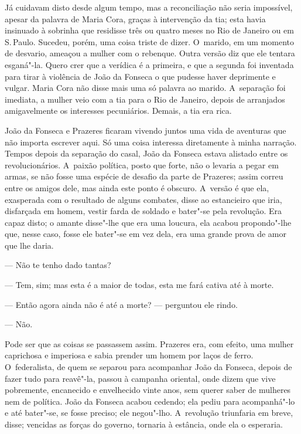 \begin{linenumbers}
Já cuidavam disto desde algum tempo, mas a reconciliação não seria
impossível, apesar da palavra de Maria Cora, graças à intervenção da
tia; esta havia insinuado à sobrinha que residisse três ou quatro meses
no Rio de Janeiro ou em S.\,Paulo. Sucedeu, porém, uma coisa triste de
dizer. O~marido, em um momento de desvario, ameaçou a mulher com o
rebenque. Outra versão diz que ele tentara esganá"-la. Quero crer que a
verídica é a primeira, e que a segunda foi inventada para tirar à
violência de João da Fonseca o que pudesse haver deprimente e vulgar.
Maria Cora não disse mais uma só palavra ao marido. A~separação foi
imediata, a mulher veio com a tia para o Rio de Janeiro, depois de
arranjados amigavelmente os interesses pecuniários. Demais, a tia era
rica.

João da Fonseca e Prazeres ficaram vivendo juntos uma vida de aventuras
que não importa escrever aqui. Só uma coisa interessa diretamente à
minha narração. Tempos depois da separação do casal, João da Fonseca
estava alistado entre os revolucionários. A~paixão política, posto que
forte, não o levaria a pegar em armas, se não fosse uma espécie de
desafio da parte de Prazeres; assim correu entre os amigos dele, mas
ainda este ponto é obscuro. A~versão é que ela, exasperada com o
resultado de alguns combates, disse ao estancieiro que iria, disfarçada
em homem, vestir farda de soldado e bater"-se pela revolução. Era capaz
disto; o amante disse"-lhe que era uma loucura, ela acabou propondo"-lhe
que, nesse caso, fosse ele bater"-se em vez dela, era uma grande prova de
amor que lhe daria.

--- Não te tenho dado tantas?

--- Tem, sim; mas esta é a maior de todas, esta me fará cativa até à
morte.

--- Então agora ainda não é até a morte? --- perguntou ele rindo.

--- Não.

Pode ser que as coisas se passassem assim. Prazeres era, com efeito, uma
mulher caprichosa e imperiosa e sabia prender um homem por laços de
ferro. O~federalista, de quem se separou para acompanhar João da
Fonseca, depois de fazer tudo para reavê"-la, passou à campanha oriental,
onde dizem que vive pobremente, encanecido e envelhecido vinte anos, sem
querer saber de mulheres nem de política. João da Fonseca acabou
cedendo; ela pediu para acompanhá"-lo e até bater"-se, se fosse preciso;
ele negou"-lho. A~revolução triunfaria em breve, disse; vencidas as
forças do governo, tornaria à estância, onde ela o esperaria.


\end{linenumbers}
